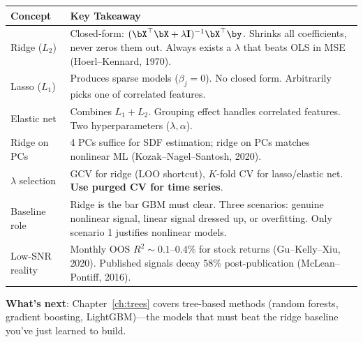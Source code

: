 \begin{center}
\begin{tabular}{p{4cm} p{9.5cm}}
\toprule
\textbf{Concept} & \textbf{Key Takeaway} \\
\midrule
Ridge ($L_2$) & Closed-form: $(\bX^\top\bX + \lambda\mathbf{I})^{-1}\bX^\top\by$. Shrinks all coefficients, never zeros them out. Always exists a $\lambda$ that beats OLS in MSE (Hoerl--Kennard, 1970). \\[6pt]
Lasso ($L_1$) & Produces sparse models ($\beta_j = 0$). No closed form. Arbitrarily picks one of correlated features. \\[6pt]
Elastic net & Combines $L_1 + L_2$. Grouping effect handles correlated features. Two hyperparameters ($\lambda, \alpha$). \\[6pt]
Ridge on PCs & 4 PCs suffice for SDF estimation; ridge on PCs matches nonlinear ML (Kozak--Nagel--Santosh, 2020). \\[6pt]
$\lambda$ selection & GCV for ridge (LOO shortcut), $K$-fold CV for lasso/elastic net. \textbf{Use purged CV for time series}. \\[6pt]
Baseline role & Ridge is the bar GBM must clear. Three scenarios: genuine nonlinear signal, linear signal dressed up, or overfitting. Only scenario 1 justifies nonlinear models. \\[6pt]
Low-SNR reality & Monthly OOS $R^2 \sim 0.1$--$0.4\%$ for stock returns (Gu--Kelly--Xiu, 2020). Published signals decay 58\% post-publication (McLean--Pontiff, 2016). \\
\bottomrule
\end{tabular}
\end{center}

\bigskip
\noindent\textbf{What's next}: Chapter~\ref{ch:trees} covers tree-based methods (random forests, gradient boosting, LightGBM)---the models that must beat the ridge baseline you've just learned to build.
